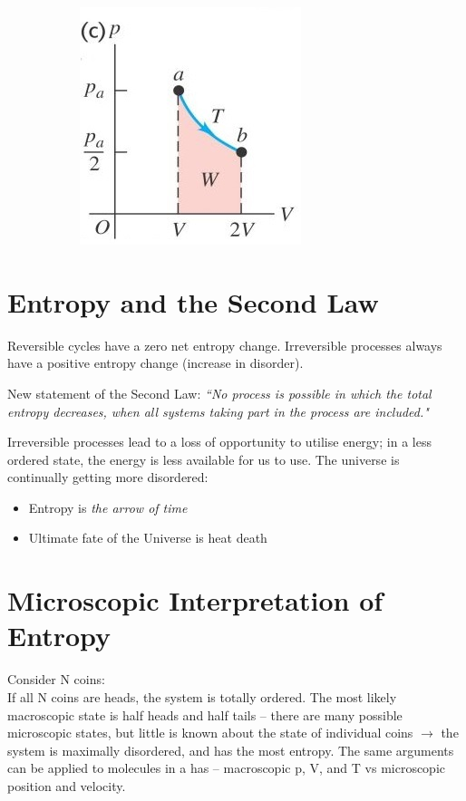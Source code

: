 \documentclass[a4paper, 11pt, normalem]{report}
\begin{document}
\begin{figure}[H]
\begin{subfigure}{0.3\textwidth}
		\includegraphics[width=\textwidth]{Entropy2.jpg}
	\end{subfigure}
\end{figure}

\section{Entropy and the Second Law}
Reversible cycles have a zero net entropy change.
Irreversible processes always have a positive entropy change (increase in disorder).

New statement of the Second Law: \emph{``No process is possible in which the total entropy decreases, when all systems taking part in the process are included."}

Irreversible processes lead to a loss of opportunity to utilise energy; in a less ordered state, the energy is less available for us to use.
The universe is continually getting more disordered:
\begin{itemize}
	\item Entropy is \emph{the arrow of time}
	\item Ultimate fate of the Universe is heat death
\end{itemize}

\section{Microscopic Interpretation of Entropy}
Consider N coins:\\
If all N coins are heads, the system is totally ordered.
The most likely macroscopic state is half heads and half tails -- there are many possible microscopic states, but little is known about the state of individual coins $\rightarrow$ the system is maximally disordered, and has the most entropy.
The same arguments can be applied to molecules in a has -- macroscopic p, V, and T vs microscopic position and velocity.
\end{document}
